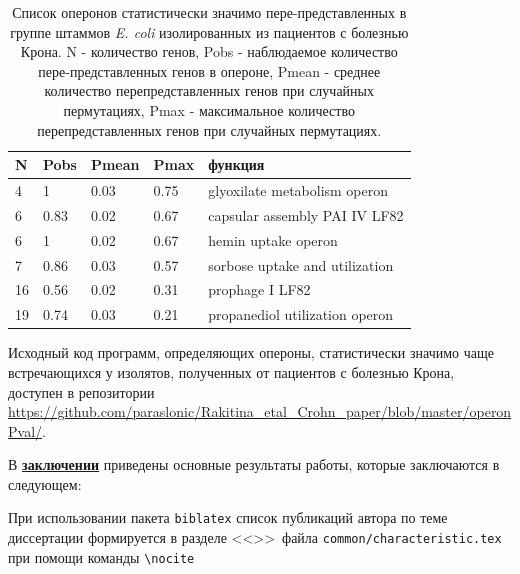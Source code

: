 \begin{table}[htbp]
\centering
\caption{Список оперонов статистически значимо пере-представленных в группе штаммов \textit{E. coli} изолированных из пациентов с болезнью Крона. N - количество генов, Pobs - наблюдаемое количество пере-представленных генов в опероне, Pmean - среднее количество перепредставленных генов при случайных пермутациях, Pmax - максимальное количество перепредставленных генов при случайных пермутациях.}
\label{tbl:ops1}
\begin{tabular}{|l|l|l|l|l|}
\hline
\textbf{N} & \textbf{Pobs} & \textbf{Pmean} & \textbf{Pmax} & \textbf{функция}                                  \\ \hline
4          & 1             & 0.03          & 0.75         & glyoxilate metabolism operon \\ \hline
6          & 0.83          & 0.02          & 0.67         & capsular assembly PAI IV LF82                              \\ \hline
6          & 1             & 0.02          & 0.67         & hemin uptake operon                                       \\ \hline
7          & 0.86          & 0.03          & 0.57         & sorbose uptake and utilization                             \\ \hline
16         & 0.56          & 0.02          & 0.31         & prophage I LF82                                            \\ \hline
19         & 0.74          & 0.03          & 0.21         & propanediol utilization operon                         \\ \hline
\end{tabular}
\end{table}

Исходный код программ, определяющих опероны, статистически значимо чаще встречающихся у изолятов, полученных от пациентов с болезнью Крона, доступен в репозитории \url{https://github.com/paraslonic/Rakitina_etal_Crohn_paper/blob/master/operonPval/}.






\FloatBarrier
{}                                  %
В \underline{\textbf{заключении}} приведены основные результаты работы, которые заключаются в следующем:


При использовании пакета \verb!biblatex! список публикаций автора по теме
диссертации формируется в разделе <<\publications>>\ файла
\verb!common/characteristic.tex!  при помощи команды \verb!\nocite!

